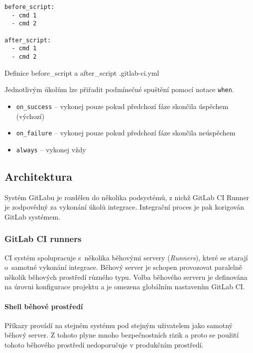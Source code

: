 \begin{listing}[ht]
\begin{verbatim}
before_script:
  - cmd 1
  - cmd 2

after_script:
  - cmd 1
  - cmd 2
\end{verbatim}
\caption{Definice before\_script a after\_script .gitlab-ci.yml}
\end{listing}

Jednotlivým úkolům lze přiřadit podmínečné spuštění pomocí notace \verb|when|.

\begin{itemize}
  \item \verb|on_success| -- vykonej pouze pokud předchozí fáze skončila úspěchem (výchozí) 
  \item \verb|on_failure| -- vykonej pouze pokud předchozí fáze skončila neúspěchem
  \item \verb|always| -- vykonej vždy
\end{itemize}

\subsection{Architektura}

Systém GitLabu je rozdělen do několika podsystémů, z nichž GitLab CI Runner je zodpovědný za vykonání úkolů integrace.
Integrační proces je pak korigován GitLab systémem.
\cite{gitlab_architecture}

\subsubsection{GitLab CI runners}

CI systém spolupracuje s~několika běhovými servery (\textit{Runners}), které se starají o~samotné vykonání integrace.
Běhový server je schopen provozovat paralelně několik běhových prostředí různého typu.
Volba běhového serveru je definována na úrovni konfigurace projektu a je omezena globálním nastavením GitLab CI.


\paragraph{Shell běhové prostředí}

Příkazy provádí na stejném systému pod stejným uživatelem jako samotný běhový server.
Z tohoto plyne mnoho bezpečnostních rizik a proto se použití tohoto běhového prostředí nedoporučuje v produkčním prostředí.


